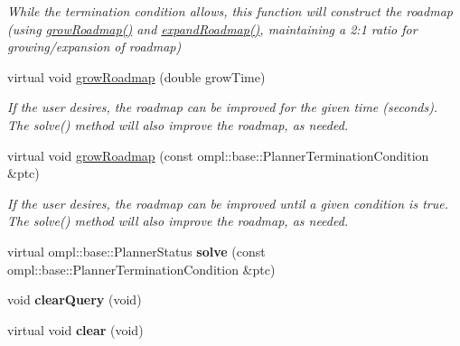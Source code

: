 \begin{DoxyCompactItemize}
\begin{DoxyCompactList}\small\item\em \-While the termination condition allows, this function will construct the roadmap (using \hyperlink{class_f_i_r_m_a947186c6e6be0b513efe0e0b476fef88}{grow\-Roadmap()} and \hyperlink{class_f_i_r_m_ad9cd5472a8bd1b1fcb83763128f7fd75}{expand\-Roadmap()}, maintaining a 2\-:1 ratio for growing/expansion of roadmap) \end{DoxyCompactList}\item 
\hypertarget{class_f_i_r_m_a947186c6e6be0b513efe0e0b476fef88}{virtual void \hyperlink{class_f_i_r_m_a947186c6e6be0b513efe0e0b476fef88}{grow\-Roadmap} (double grow\-Time)}\label{class_f_i_r_m_a947186c6e6be0b513efe0e0b476fef88}

\begin{DoxyCompactList}\small\item\em \-If the user desires, the roadmap can be improved for the given time (seconds). \-The solve() method will also improve the roadmap, as needed. \end{DoxyCompactList}\item 
\hypertarget{class_f_i_r_m_ae8e741b0af39a64d34dcfa4f29c0e509}{virtual void \hyperlink{class_f_i_r_m_ae8e741b0af39a64d34dcfa4f29c0e509}{grow\-Roadmap} (const ompl\-::base\-::\-Planner\-Termination\-Condition \&ptc)}\label{class_f_i_r_m_ae8e741b0af39a64d34dcfa4f29c0e509}

\begin{DoxyCompactList}\small\item\em \-If the user desires, the roadmap can be improved until a given condition is true. \-The solve() method will also improve the roadmap, as needed. \end{DoxyCompactList}\item 
\hypertarget{class_f_i_r_m_a02f3c98de4840594193ba5bf7ff3ca63}{virtual ompl\-::base\-::\-Planner\-Status {\bfseries solve} (const ompl\-::base\-::\-Planner\-Termination\-Condition \&ptc)}\label{class_f_i_r_m_a02f3c98de4840594193ba5bf7ff3ca63}

\item 
\hypertarget{class_f_i_r_m_acf7c24814ea6b8cad9cad350dea66560}{void {\bfseries clear\-Query} (void)}\label{class_f_i_r_m_acf7c24814ea6b8cad9cad350dea66560}

\item 
\hypertarget{class_f_i_r_m_afe5298e85713c7a736d6b8936f7171af}{virtual void {\bfseries clear} (void)}\label{class_f_i_r_m_afe5298e85713c7a736d6b8936f7171af}


\end{DoxyCompactItemize}
